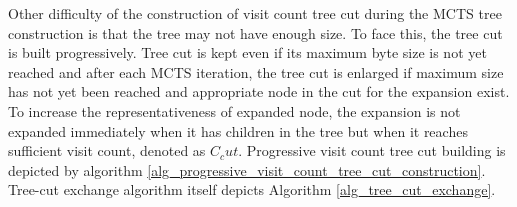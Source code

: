 Other difficulty of the construction of visit count tree cut during the MCTS tree construction
is that the tree may not have enough size. To face this, the tree cut is built progressively.
Tree cut is kept even if its maximum byte size is not yet reached and after each MCTS
iteration, the tree cut is enlarged if maximum size has not yet been reached and appropriate
node in the cut for the expansion exist. To increase the representativeness of expanded node,
the expansion is not expanded immediately when it has children in the tree but when it reaches
sufficient visit count, denoted as $C_cut$. Progressive visit count tree cut building is
depicted by algorithm \ref{alg_progressive_visit_count_tree_cut_construction}. Tree-cut
exchange algorithm itself depicts Algorithm \ref{alg_tree_cut_exchange}.

